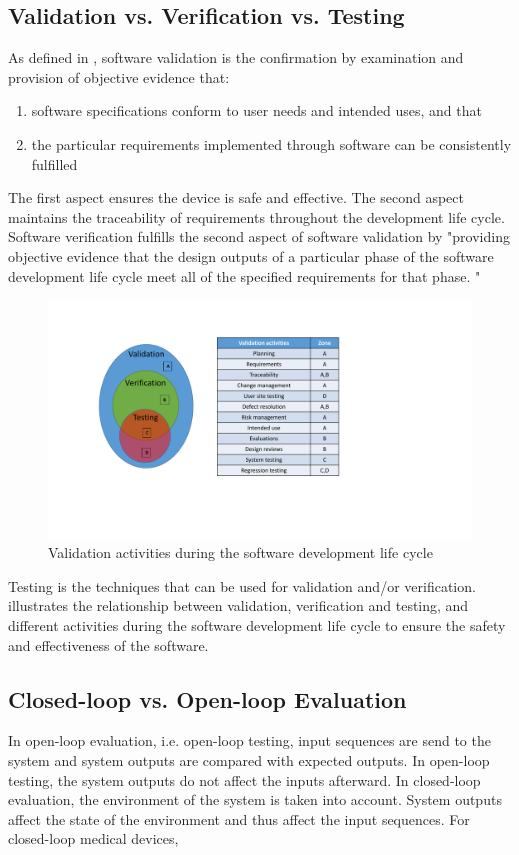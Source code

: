 \subsection{Validation vs. Verification vs. Testing}
As defined in \cite{fda2}, software validation is the confirmation by examination and provision of objective evidence that:
\begin{enumerate}
	\item software specifications conform to user needs and intended uses, and that
	\item the particular requirements implemented through software can be consistently fulfilled
\end{enumerate}
The first aspect ensures the device is safe and effective. The second aspect maintains the traceability of requirements throughout the development life cycle.
Software verification fulfills the second aspect of software validation by "providing objective evidence that the design outputs of a particular phase of the software development life cycle meet all of the specified requirements for that phase. "
\begin{figure}[t]
		\centering
		\includegraphics[width=\textwidth]{figs/validation.pdf}
		\caption{Validation activities during the software development life cycle\cite{Vogel}}
		\label{fig:validation}
\end{figure}
Testing is the techniques that can be used for validation and/or verification.  illustrates the relationship between validation, verification and testing, and different activities during the software development life cycle to ensure the safety and effectiveness of the software.
\subsection{Closed-loop vs. Open-loop Evaluation}
In open-loop evaluation, i.e. open-loop testing, input sequences are send to the system and system outputs are compared with expected outputs. In open-loop testing, the system outputs do not affect the inputs afterward. In closed-loop evaluation, the environment of the system is taken into account. System outputs affect the state of the environment and thus affect the input sequences. For closed-loop medical devices,

